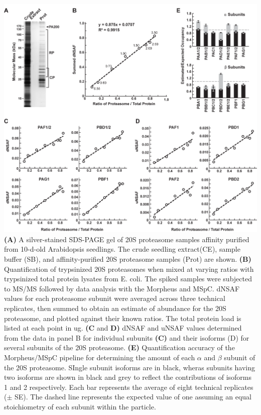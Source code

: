 \begin{FPfigure}
	\centering
	\includegraphics[width=\columnwidth]{MSpC/figure2_rescale.png}
	{\textbf{(A)} A silver-stained SDS-PAGE gel of 20S proteasome samples affinity purified from 10-d-old Arabidopsis seedlings. The crude seedling extract(CE), sample buffer (SB), and affinity-purified 20S proteasome samples (Prot) are shown. \textbf{(B)} Quantification of trypsinized 20S proteasomes when mixed at varying ratios with trypsinized total protein lysates from E. coli. The spiked samples were subjected to MS/MS followed by data analysis with the Morpheus and MSpC. dNSAF values for each proteasome subunit were averaged across three technical replicates, then summed to obtain an estimate of abundance for the 20S proteasome, and plotted against their known ratios. The total protein load is listed at each point in ug. \textbf{(C} and \textbf{D)} dNSAF and uNSAF values determined from the data in panel B for individual subunits \textbf{(C)} and their isoforms {(D)} for several subunits of the 20S proteasome. \textbf{(E)} Quantification accuracy of the Morpheus/MSpC pipeline for determining the amount of each $\alpha$ and $\beta$ subunit of the 20S proteasome. SIngle subunit isoforms are in black, wheras subunits having two isoforms are shown in black and grey to reflect the contributions of isoforms 1 and 2 respectively. Each bar represents the average of eight technical replicates ($\pm$ SE). The dashed line represents the expected value of one assuming an equal stoichiometry of each subunit within the particle.}
	\label{fig:proteasomespike}
\end{FPfigure}
